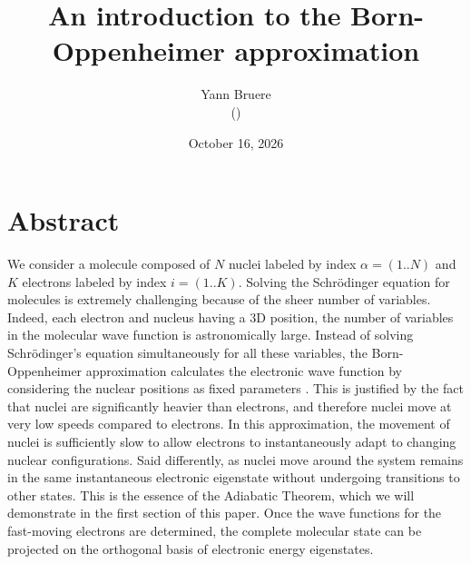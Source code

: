 \documentclass[11pt,a4paper]{article}
\title{An introduction to the Born-Oppenheimer approximation}
\date{October 16, 2026}
\author{Yann Bruere \\ (\text{yann.bruere@gmail.com})}
\begin{document}
\maketitle

\section{Abstract}
We consider a molecule composed of $N$ nuclei labeled by index $\alpha=(1..N)$ and $K$ electrons labeled by index $i=(1..K)$. Solving the Schrödinger equation for molecules is extremely challenging because of the sheer number of variables. Indeed, each electron and nucleus having a 3D position, the number of variables in the molecular wave function is astronomically large. Instead of solving Schrödinger’s equation simultaneously for all these variables, the Born-Oppenheimer approximation calculates the electronic wave function by considering the nuclear positions as fixed parameters \cite{Born1927}. This is justified by the fact that nuclei are significantly heavier than electrons, and therefore nuclei move at very low speeds compared to electrons. In this approximation, the movement of nuclei is sufficiently slow to allow electrons to instantaneously adapt to changing nuclear configurations. Said differently, as nuclei move around the system remains in the same instantaneous electronic eigenstate without undergoing transitions to other states. This is the essence of the Adiabatic Theorem, which we will demonstrate in the first section of this paper. Once the wave functions for the fast-moving electrons are determined, the complete molecular state can be projected on the orthogonal basis of electronic energy eigenstates.
\end{document}
